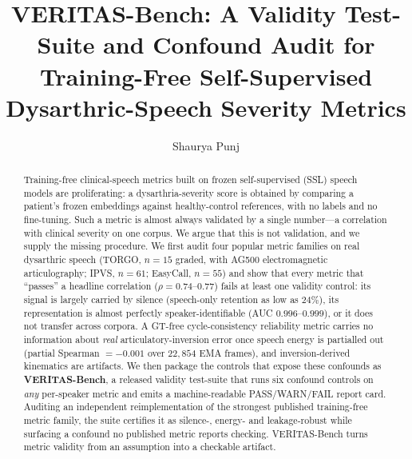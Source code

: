 \documentclass[runningheads]{llncs}
\begin{document}
\title{VERITAS-Bench: A Validity Test-Suite and Confound Audit for Training-Free
Self-Supervised Dysarthric-Speech Severity Metrics}

\author{Shaurya Punj}

\maketitle

\begin{abstract}
Training-free clinical-speech metrics built on frozen self-supervised (SSL)
speech models are proliferating: a dysarthria-severity score is obtained by
comparing a patient's frozen embeddings against healthy-control references, with
no labels and no fine-tuning. Such a metric is almost always validated by a
single number---a correlation with clinical severity on one corpus. We argue
that this is not validation, and we supply the missing procedure. We first audit
four popular metric families on real dysarthric speech (TORGO, $n{=}15$ graded,
with AG500 electromagnetic articulography; IPVS, $n{=}61$; EasyCall, $n{=}55$)
and show that every metric that ``passes'' a headline correlation
($\rho{=}0.74$--$0.77$) fails at least one validity control: its signal is
largely carried by silence (speech-only retention as low as $24\%$), its
representation is almost perfectly speaker-identifiable (AUC $0.996$--$0.999$),
or it does not transfer across corpora. A GT-free cycle-consistency reliability
metric carries no information about \emph{real} articulatory-inversion error once
speech energy is partialled out (partial Spearman $=-0.001$ over $22{,}854$ EMA
frames), and inversion-derived kinematics are artifacts. We then package the
controls that expose these confounds as \textbf{VERITAS-Bench}, a released
validity test-suite that runs six confound controls on \emph{any} per-speaker
metric and emits a machine-readable PASS/WARN/FAIL report card. Auditing an
independent reimplementation of the strongest published training-free metric
family, the suite certifies it as silence-, energy- and leakage-robust while
surfacing a confound no published metric reports checking. VERITAS-Bench turns
metric validity from an assumption into a checkable artifact.
\end{abstract}
\end{document}
